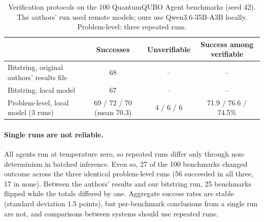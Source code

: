 \begin{table}[t]
\centering
\caption{Verification protocols on the 100 QuantumQUBO Agent benchmarks (seed 42). The authors' run used
remote models; ours use Qwen3.6-35B-A3B locally. Problem-level: three repeated runs.}
\label{tab:verification}
\small
\begin{tabular}{@{}lccc@{}}
\toprule
 & Successes & Unverifiable & Success among verifiable \\
\midrule
Bitstring, original authors' results file & 68 & -- & -- \\
Bitstring, local model & 67 & -- & -- \\
Problem-level, local model (3 runs) & 69 / 72 / 70 (mean 70.3) & 4 / 6 / 6 & 71.9 / 76.6 / 74.5\% \\
\bottomrule
\end{tabular}
\end{table}

\paragraph{Single runs are not reliable.}
All agents run at temperature zero, so repeated runs differ only through non-determinism in batched inference.
Even so, 27 of the 100 benchmarks changed outcome across the three identical problem-level runs (56 succeeded in
all three, 17 in none). Between the authors' results and our bitstring run, 25 benchmarks flipped while the totals
differed by one. Aggregate success rates are stable (standard deviation 1.5 points), but per-benchmark conclusions
from a single run are not, and comparisons between systems should use repeated runs.

